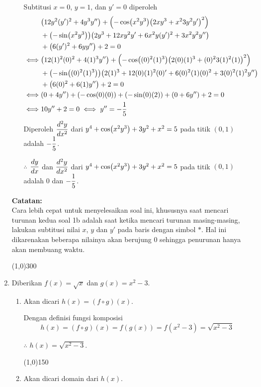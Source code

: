 \begin{enumerate}[leftmargin=*, label={\arabic*}.]
\begin{enumerate}[label={\alph*}.]
    Subtitusi $x=0$, $y=1$, dan $y'=0$ diperoleh
    \begin{align*}
        &\brk*{12y^{2}(y')^{2}+4y^{3}y''}
        +\brk*{-\cos\brk*{x^{2}y^{3}}\brk*{2xy^{3}+x^{2}3y^{2}y'}^{2}}
        \\&+\brk*{-\sin\brk*{x^{2}y^{3}}}
        \brk*{2y^{3}+12xy^{2}y'+6x^{2}y(y')^{2}+3x^{2}y^{2}y''}\\
        &+\brk*{6(y')^{2}+6yy''} + 2 = 0\\
        \iff &\brk*{12(1)^{2}(0)^{2}+4(1)^{3}y''}
        +\brk*{-\cos\brk*{(0)^{2}(1)^{3}}\brk*{2(0)(1)^{3}+(0)^{2}3(1)^{2}(1)}^{2}}
        \\&+\brk*{-\sin\brk*{(0)^{2}(1)^{3}}}
        \brk*{2(1)^{3}+12(0)(1)^{2}(0)'+6(0)^{2}(1)(0)^{2}+3(0)^{2}(1)^{2}y''}\\
        &+\brk*{6(0)^{2}+6(1)y''} + 2 = 0\\
        \iff &(0+4y'')+(-\cos(0)(0))+(-\sin(0)(2))+(0+6y'')+2=0\\
        \iff &10y''+2=0 \iff y'' = -\frac{1}{5}
    \end{align*}
    Diperoleh $\displaystyle\frac{d^{2}y}{dx^{2}}$ dari 
    $y^{4}+\cos\brk*{x^{2}y^{3}}+3y^{2}+x^{2}=5$ pada titik $(0,1)$ adalah $\displaystyle-\frac{1}{5}$.
    
    $\therefore$ $\displaystyle\frac{dy}{dx}$ dan $\displaystyle\frac{d^{2}y}{dx^{2}}$ dari 
    $y^{4}+\cos\brk*{x^{2}y^{3}}+3y^{2}+x^{2}=5$ pada titik $(0,1)$ adalah $0$ dan $\displaystyle-\frac{1}{5}$.
\end{enumerate}
\vspace{0.1cm}
\textbf{Catatan:}\\
Cara lebih cepat untuk menyelesaikan soal ini, khususnya saat mencari 
turunan kedua soal 1b adalah saat ketika mencari turunan masing-masing, 
lakukan subtitusi nilai $x$, $y$ dan $y'$ pada baris dengan simbol $*$. 
Hal ini dikarenakan beberapa nilainya akan berujung $0$ sehingga penurunan 
hanya akan membuang waktu.
\begin{center}
    \line(1,0){300}
\end{center}
\item Diberikan $f(x)=\sqrt{x}$ dan $g(x)=x^{2}-3$.
\begin{enumerate}[label={\alph*}.]
    \item Akan dicari $h(x)=(f \circ g)(x)$.

    Dengan definisi fungsi komposisi
    \[
    h(x)=(f \circ g)(x)=f(g(x))=f(x^{2}-3) = \sqrt{x^{2}-3}
    \]

    $\therefore$ $h(x) = \sqrt{x^{2}-3}$.
\begin{center}
    \line(1,0){150}
\end{center}
    \item Akan dicari domain dari $h(x)$.
    

\end{enumerate}
\end{enumerate}
